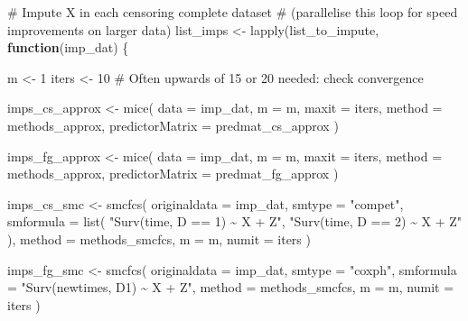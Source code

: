 \documentclass[
  12pt,
  a4paper,
]{article}
\newenvironment{Shaded}{\begin{snugshade}}{\end{snugshade}}
\newcommand{\AttributeTok}[1]{\textcolor[rgb]{0.40,0.45,0.13}{#1}}
\newcommand{\CommentTok}[1]{\textcolor[rgb]{0.37,0.37,0.37}{#1}}
\newcommand{\ControlFlowTok}[1]{\textcolor[rgb]{0.00,0.23,0.31}{\textbf{#1}}}
\newcommand{\DecValTok}[1]{\textcolor[rgb]{0.68,0.00,0.00}{#1}}
\newcommand{\FunctionTok}[1]{\textcolor[rgb]{0.28,0.35,0.67}{#1}}
\newcommand{\NormalTok}[1]{\textcolor[rgb]{0.00,0.23,0.31}{#1}}
\newcommand{\OtherTok}[1]{\textcolor[rgb]{0.00,0.23,0.31}{#1}}
\newcommand{\StringTok}[1]{\textcolor[rgb]{0.13,0.47,0.30}{#1}}
\begin{document}
\begin{Shaded}
\begin{Highlighting}[]
\CommentTok{\# Impute X in each censoring complete dataset}
\CommentTok{\# (parallelise this loop for speed improvements on larger data)}
\NormalTok{list\_imps }\OtherTok{\textless{}{-}} \FunctionTok{lapply}\NormalTok{(list\_to\_impute, }\ControlFlowTok{function}\NormalTok{(imp\_dat) \{}

\NormalTok{  m }\OtherTok{\textless{}{-}} \DecValTok{1}
\NormalTok{  iters }\OtherTok{\textless{}{-}} \DecValTok{10} \CommentTok{\# Often upwards of 15 or 20 needed: check convergence}
  
\NormalTok{  imps\_cs\_approx }\OtherTok{\textless{}{-}} \FunctionTok{mice}\NormalTok{(}
    \AttributeTok{data =}\NormalTok{ imp\_dat,}
    \AttributeTok{m =}\NormalTok{ m,}
    \AttributeTok{maxit =}\NormalTok{ iters,}
    \AttributeTok{method =}\NormalTok{ methods\_approx,}
    \AttributeTok{predictorMatrix =}\NormalTok{ predmat\_cs\_approx}
\NormalTok{  )}

\NormalTok{  imps\_fg\_approx }\OtherTok{\textless{}{-}} \FunctionTok{mice}\NormalTok{(}
    \AttributeTok{data =}\NormalTok{ imp\_dat,}
    \AttributeTok{m =}\NormalTok{ m,}
    \AttributeTok{maxit =}\NormalTok{ iters,}
    \AttributeTok{method =}\NormalTok{ methods\_approx,}
    \AttributeTok{predictorMatrix =}\NormalTok{ predmat\_fg\_approx}
\NormalTok{  )}

\NormalTok{  imps\_cs\_smc }\OtherTok{\textless{}{-}} \FunctionTok{smcfcs}\NormalTok{(}
    \AttributeTok{originaldata =}\NormalTok{ imp\_dat,}
    \AttributeTok{smtype =} \StringTok{"compet"}\NormalTok{,}
    \AttributeTok{smformula =} \FunctionTok{list}\NormalTok{(}
      \StringTok{"Surv(time, D == 1) \textasciitilde{} X + Z"}\NormalTok{,}
      \StringTok{"Surv(time, D == 2) \textasciitilde{} X + Z"}
\NormalTok{    ),}
    \AttributeTok{method =}\NormalTok{ methods\_smcfcs,}
    \AttributeTok{m =}\NormalTok{ m,}
    \AttributeTok{numit =}\NormalTok{ iters}
\NormalTok{  )}

\NormalTok{  imps\_fg\_smc }\OtherTok{\textless{}{-}} \FunctionTok{smcfcs}\NormalTok{(}
    \AttributeTok{originaldata =}\NormalTok{ imp\_dat,}
    \AttributeTok{smtype =} \StringTok{"coxph"}\NormalTok{,}
    \AttributeTok{smformula =} \StringTok{"Surv(newtimes, D1) \textasciitilde{} X + Z"}\NormalTok{,}
    \AttributeTok{method =}\NormalTok{ methods\_smcfcs,}
    \AttributeTok{m =}\NormalTok{ m,}
    \AttributeTok{numit =}\NormalTok{ iters}
\NormalTok{  )}


\end{Highlighting}
\end{Shaded}
\end{document}
